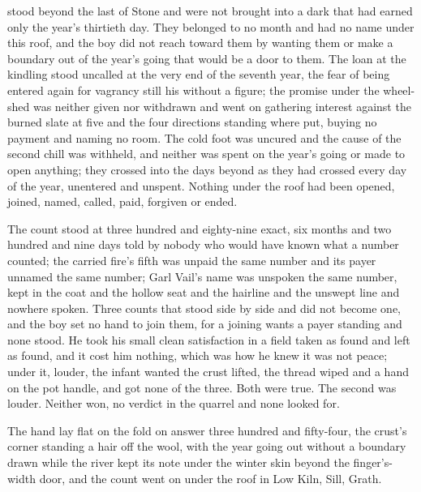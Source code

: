  stood beyond the last of Stone and were not brought into a dark that had earned only the year's thirtieth day. They belonged to no month and had no name under this roof, and the boy did not reach toward them by wanting them or make a boundary out of the year's going that would be a door to them. The loan at the kindling stood uncalled at the very end of the seventh year, the fear of being entered again for vagrancy still his without a figure; the promise under the wheel-shed was neither given nor withdrawn and went on gathering interest against the burned slate at five and the four directions standing where put, buying no payment and naming no room. The cold foot was uncured and the cause of the second chill was withheld, and neither was spent on the year's going or made to open anything; they crossed into the days beyond as they had crossed every day of the year, unentered and unspent. Nothing under the roof had been opened, joined, named, called, paid, forgiven or ended.

The count stood at three hundred and eighty-nine exact, six months and two hundred and nine days told by nobody who would have known what a number counted; the carried fire's fifth was unpaid the same number and its payer unnamed the same number; Garl Vail's name was unspoken the same number, kept in the coat and the hollow seat and the hairline and the unswept line and nowhere spoken. Three counts that stood side by side and did not become one, and the boy set no hand to join them, for a joining wants a payer standing and none stood. He took his small clean satisfaction in a field taken as found and left as found, and it cost him nothing, which was how he knew it was not peace; under it, louder, the infant wanted the crust lifted, the thread wiped and a hand on the pot handle, and got none of the three. Both were true. The second was louder. Neither won, no verdict in the quarrel and none looked for.

The hand lay flat on the fold on answer three hundred and fifty-four, the crust's corner standing a hair off the wool, with the year going out without a boundary drawn while the river kept its note under the winter skin beyond the finger's-width door, and the count went on under the roof in Low Kiln, Sill, Grath.
